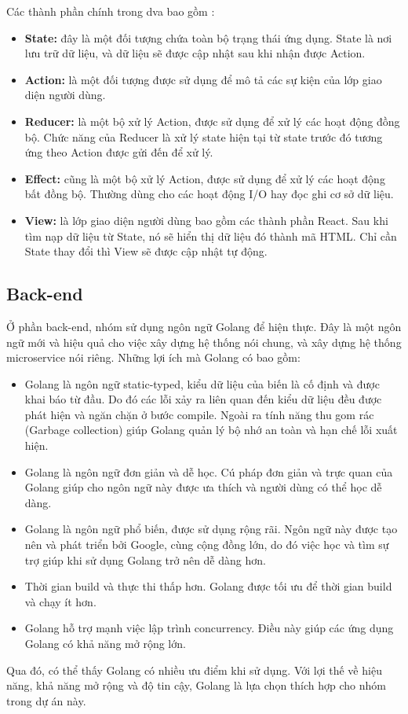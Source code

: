             Các thành phần chính trong dva bao gồm \cite{technologyDvaAdvance}: 
            \begin{itemize}
                \item \textbf{State:} đây là một đối tượng chứa toàn bộ trạng thái ứng dụng. State là nơi lưu trữ dữ liệu, và dữ liệu sẽ được cập nhật sau khi nhận được Action.
                \item \textbf{Action:} là một đối tượng được sử dụng để mô tả các sự kiện của lớp giao diện người dùng.
                \item \textbf{Reducer:} là một bộ xử lý Action, được sử dụng để xử lý các hoạt động đồng bộ. Chức năng của Reducer là xử lý state hiện tại từ state trước đó tương ứng theo Action được gửi đến để xử lý.
                \item \textbf{Effect:} cũng là một bộ xử lý Action, được sử dụng để xử lý các hoạt động bất đồng bộ. Thường dùng cho các hoạt động I/O hay đọc ghi cơ sở dữ liệu.
                \item \textbf{View:} là lớp giao diện người dùng bao gồm các thành phần React. Sau khi tìm nạp dữ liệu từ State, nó sẽ hiển thị dữ liệu đó thành mã HTML. Chỉ cần State thay đổi thì View sẽ được cập nhật tự động.
            \end{itemize}

    
    \subsection{Back-end}
\par Ở phần back-end, nhóm sử dụng ngôn ngữ Golang để hiện thực. Đây là một ngôn ngữ mới và hiệu quả cho việc xây dựng hệ thống nói chung, và xây dựng hệ thống microservice nói riêng.
Những lợi ích mà Golang có bao gồm:
\begin{itemize}
    \item Golang là ngôn ngữ static-typed, kiểu dữ liệu của biến là cố định và được khai báo từ đầu. Do đó các lỗi xảy ra liên quan đến kiểu dữ liệu đều được phát hiện và ngăn chặn ở bước compile. Ngoài ra tính năng thu gom rác (Garbage collection) giúp Golang quản lý bộ nhớ an toàn và hạn chế lỗi xuất hiện.
    \item Golang là ngôn ngữ đơn giản và dễ học. Cú pháp đơn giản và trực quan của Golang giúp cho ngôn ngữ này được ưa thích và người dùng có thể học dễ dàng.
    \item Golang là ngôn ngữ phổ biến, được sử dụng rộng rãi. Ngôn ngữ này được tạo nên và phát triển bởi Google, cùng cộng đồng lớn, do đó việc học và tìm sự trợ giúp khi sử dụng Golang trở nên dễ dàng hơn.
    \item Thời gian build và thực thi thấp hơn. Golang được tối ưu để thời gian build và chạy ít hơn.
    \item Golang hỗ trợ mạnh việc lập trình concurrency. Điều này giúp các ứng dụng Golang có khả năng mở rộng lớn.
\end{itemize}
\par Qua đó, có thể thấy Golang có nhiều ưu điểm khi sử dụng. Với lợi thế về hiệu năng, khả năng mở rộng và độ tin cậy, Golang là lựa chọn thích hợp cho nhóm trong dự án này.